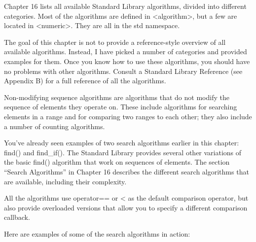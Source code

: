 
Chapter 16 lists all available Standard Library algorithms, divided into different categories. Most of the algorithms are defined in <algorithm>, but a few are located in <numeric>. They are all in the std namespace.

The goal of this chapter is not to provide a reference-style overview of all available algorithms. Instead, I have picked a number of categories and provided examples for them. Once you know how to use these algorithms, you should have no problems with other algorithms. Consult a Standard Library Reference (see Appendix B) for a full reference of all the algorithms.


Non-modifying sequence algorithms are algorithms that do not modify the sequence of elements they operate on. These include algorithms for searching elements in a range and for comparing two ranges to each other; they also include a number of counting algorithms.



You’ve already seen examples of two search algorithms earlier in this chapter: find() and find\_if(). The Standard Library provides several other variations of the basic find() algorithm that work on sequences of elements. The section “Search Algorithms” in Chapter 16 describes the different search algorithms that are available, including their complexity.

All the algorithms use operator== or < as the default comparison operator, but also provide overloaded versions that allow you to specify a different comparison callback.

Here are examples of some of the search algorithms in action:

